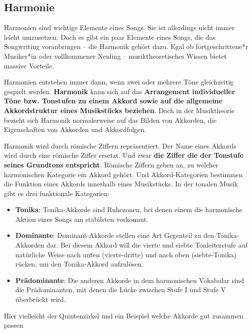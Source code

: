 \subsection{Harmonie}
Harmonien sind wichtige Elemente eines Songs. Sie ist allerdings nicht immer leicht umzusetzen. 
Doch es gibt ein paar Elemente eines Songs, die das Songwriting voranbringen – die Harmonik gehört dazu. 
Egal ob fortgeschrittene*r Musiker*in oder vollkommener Neuling – musiktheoretisches Wissen bietet massive Vorteile.

Harmonien entstehen immer dann, wenn zwei oder mehrere Töne gleichzeitig gespielt werden. \textbf{Harmonik} kann 
sich auf das \textbf{Arrangement individueller Töne bzw. Tonstufen zu einem Akkord sowie auf die allgemeine Akkordstruktur 
eines Musikstücks beziehen}. Doch in der Musiktheorie bezieht sich Harmonik normalerweise auf das Bilden 
von Akkorden, die Eigenschaften von Akkorden und Akkordfolgen.

Harmonik wird durch römische Ziffern repräsentiert. Der Name eines Akkords wird durch eine römische Ziffer
ersetzt. Und zwar \textbf{die Ziffer die der Tonstufe seines Grundtons entspricht}. Römische Ziffern geben an, 
zu welcher harmonischen Kategorie ein Akkord gehört. Und Akkord-Kategorien bestimmen die Funktion eines 
Akkords innerhalb eines Musikstücks. In der tonalen Musik gibt es drei funktionale Kategorien:

\begin{itemize}
    \item \textbf{Tonika}: Tonika-Akkorde sind Ruhezonen, bei denen einem die harmonische Aktion eines 
    Songs am stabilsten vorkommt.
    \item \textbf{Dominante}: Dominant-Akkorde stellen eine Art Gegenteil zu den Tonika-Akkorden dar. 
    Bei diesem Akkord will die vierte und siebte Tonleiterstufe auf natürliche Weise nach unten 
    (vierte-dritte) und nach oben (siebte-Tonika) rücken, um den Tonika-Akkord aufzulösen.
    \item \textbf{Prädominante}: Die anderen Akkorde in dem harmonischen Vokabular sind die Prädominanten, 
    mit denen die Lücke zwischen Stufe I und Stufe V überbrückt wird.
\end{itemize}

Hier vielleicht der Quintenzirkel und ein Beispiel welche Akkorde gut zusammen passen